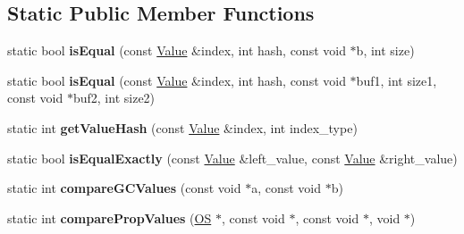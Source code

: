 \subsection*{Static Public Member Functions}
\begin{DoxyCompactItemize}
\item 
static bool {\bfseries is\+Equal} (const \hyperlink{struct_object_script_1_1_o_s_1_1_core_1_1_value}{Value} \&index, int hash, const void $\ast$b, int size)\hypertarget{class_object_script_1_1_o_s_1_1_core_a53a0e0b3dc33783867790ea5701269a4}{}\label{class_object_script_1_1_o_s_1_1_core_a53a0e0b3dc33783867790ea5701269a4}

\item 
static bool {\bfseries is\+Equal} (const \hyperlink{struct_object_script_1_1_o_s_1_1_core_1_1_value}{Value} \&index, int hash, const void $\ast$buf1, int size1, const void $\ast$buf2, int size2)\hypertarget{class_object_script_1_1_o_s_1_1_core_aaaca77df9424912d2ec45b8a678a18b6}{}\label{class_object_script_1_1_o_s_1_1_core_aaaca77df9424912d2ec45b8a678a18b6}

\item 
static int {\bfseries get\+Value\+Hash} (const \hyperlink{struct_object_script_1_1_o_s_1_1_core_1_1_value}{Value} \&index, int index\+\_\+type)\hypertarget{class_object_script_1_1_o_s_1_1_core_a3cacf0b6af5a29be6494e2d9067bcde9}{}\label{class_object_script_1_1_o_s_1_1_core_a3cacf0b6af5a29be6494e2d9067bcde9}

\item 
static bool {\bfseries is\+Equal\+Exactly} (const \hyperlink{struct_object_script_1_1_o_s_1_1_core_1_1_value}{Value} \&left\+\_\+value, const \hyperlink{struct_object_script_1_1_o_s_1_1_core_1_1_value}{Value} \&right\+\_\+value)\hypertarget{class_object_script_1_1_o_s_1_1_core_a6fb46d1980470af46f6aded0d8d9c110}{}\label{class_object_script_1_1_o_s_1_1_core_a6fb46d1980470af46f6aded0d8d9c110}

\item 
static int {\bfseries compare\+G\+C\+Values} (const void $\ast$a, const void $\ast$b)\hypertarget{class_object_script_1_1_o_s_1_1_core_a63daa38122f17259ddc2bd2add959d03}{}\label{class_object_script_1_1_o_s_1_1_core_a63daa38122f17259ddc2bd2add959d03}

\item 
static int {\bfseries compare\+Prop\+Values} (\hyperlink{class_object_script_1_1_o_s}{OS} $\ast$, const void $\ast$, const void $\ast$, void $\ast$)\hypertarget{class_object_script_1_1_o_s_1_1_core_a6a78ac0575dd95a943fe898f3a9e05b9}{}\label{class_object_script_1_1_o_s_1_1_core_a6a78ac0575dd95a943fe898f3a9e05b9}


\end{DoxyCompactItemize}
